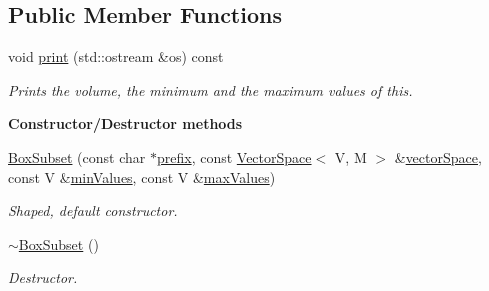\subsection*{Public Member Functions}
\begin{DoxyCompactItemize}
\item 
void \hyperlink{class_q_u_e_s_o_1_1_box_subset_ae5490757cf0504fbe31681bf0b291e93}{print} (std\-::ostream \&os) const 
\begin{DoxyCompactList}\small\item\em Prints the volume, the minimum and the maximum values of {\ttfamily this}. \end{DoxyCompactList}\end{DoxyCompactItemize}
\begin{Indent}{\bf Constructor/\-Destructor methods}\par
\begin{DoxyCompactItemize}
\item 
\hyperlink{class_q_u_e_s_o_1_1_box_subset_a87bd3b29193a18a68a7be3b9469491c0}{Box\-Subset} (const char $\ast$\hyperlink{class_q_u_e_s_o_1_1_vector_set_aedcd4b0f502af4c6e6df863c13cddfec}{prefix}, const \hyperlink{class_q_u_e_s_o_1_1_vector_space}{Vector\-Space}$<$ V, M $>$ \&\hyperlink{class_q_u_e_s_o_1_1_vector_subset_afc859b5206bc056c66893c854c191959}{vector\-Space}, const V \&\hyperlink{class_q_u_e_s_o_1_1_box_subset_a57d3ba7df60a38abc4c161ff78f4a567}{min\-Values}, const V \&\hyperlink{class_q_u_e_s_o_1_1_box_subset_a47616371623019a8c6399d5b3661d25b}{max\-Values})
\begin{DoxyCompactList}\small\item\em Shaped, default constructor. \end{DoxyCompactList}\item 
\hyperlink{class_q_u_e_s_o_1_1_box_subset_a9e78b65ed80f2d11d1161a2fcfbb543d}{$\sim$\-Box\-Subset} ()
\begin{DoxyCompactList}\small\item\em Destructor. \end{DoxyCompactList}\end{DoxyCompactItemize}
\end{Indent}
